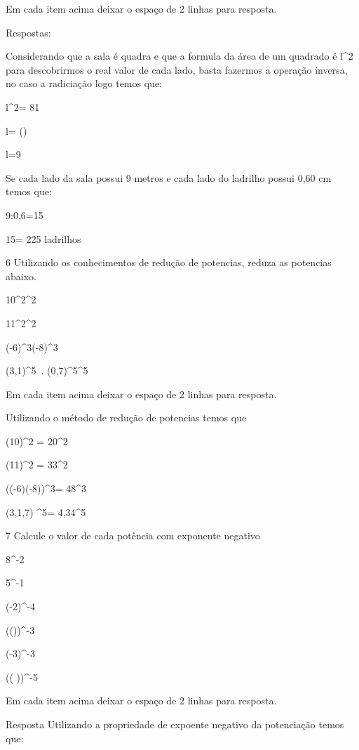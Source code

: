 Em cada item acima deixar o espaço de 2 linhas para resposta.

Respostas:

\item Considerando que a sala é quadra e que a formula da área de um
quadrado é l^2 para descobrirmos o real valor de cada lado, basta
fazermos a operação inversa, no caso a radiciação logo temos que:

l^2= 81

l= ()

l=9

\item Se cada lado da sala possui 9 metros e cada lado do ladrilho possui
0,60 cm temos que:

9:0,6=15

15= 225 ladrilhos

\num{6} Utilizando os conhecimentos de redução de potencias, reduza as
potencias abaixo.


\item 10^2^2
\item 11^2^2


\item (-6)^3\times (-8)^3
\item (3,1)^5~.
(0,7)^5^5

Em cada item acima deixar o espaço de 2 linhas para resposta.

Utilizando o método de redução de potencias temos que

\item (10)^2 = 20^2
\item (11)^2 = 33^2
\item ((-6)\times (-8))^3= 48^3
\item (3,1,7) ^5= 4,34^5

\num{7} Calcule o valor de cada potência com exponente negativo

\item 8^-2
\item 5^-1
\item (-2)^-4
\item (())^-3
\item (-3)^-3
\item (\left(  \right))^-5

Em cada item acima deixar o espaço de 2 linhas para resposta.

Resposta Utilizando a propriedade de expoente negativo da potenciação
temos que:

